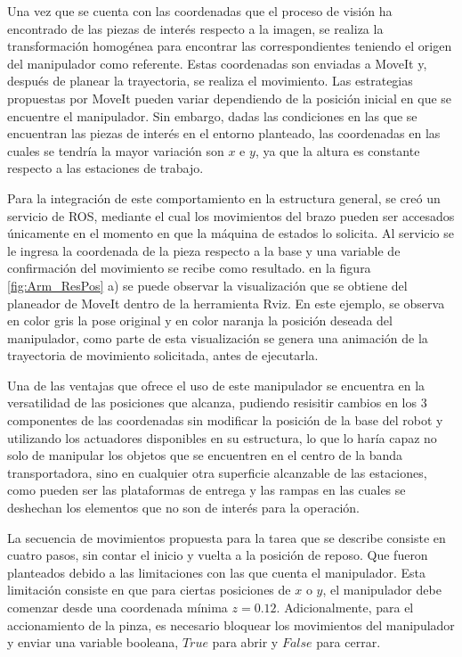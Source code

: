 Una vez que se cuenta con las coordenadas que el proceso de visión ha encontrado de las piezas de interés respecto a la imagen, se realiza la transformación homogénea para encontrar las correspondientes teniendo el origen del manipulador como referente. Estas coordenadas son enviadas a MoveIt y, después de planear la trayectoria, se realiza el movimiento. Las estrategias propuestas por MoveIt pueden variar dependiendo de la posición inicial en que se encuentre el manipulador. Sin embargo, dadas las condiciones en las que se encuentran las piezas de interés en el entorno planteado, las coordenadas en las cuales se tendría la mayor variación son $x$ e $y$, ya que la altura es constante respecto a las estaciones de trabajo. 

Para la integración de este comportamiento en la estructura general, se creó un servicio de ROS, mediante el cual los movimientos del brazo pueden ser accesados únicamente en el momento en que la máquina de estados lo solicita. Al servicio se le ingresa la coordenada de la pieza respecto a la base y una variable de confirmación del movimiento se recibe como resultado. en la figura \ref{fig:Arm_ResPos} a) se puede observar la visualización que se obtiene del planeador de MoveIt dentro de la herramienta Rviz. En este ejemplo, se observa en color gris la pose original y en color naranja la posición deseada del manipulador, como parte de esta visualización se genera una animación de la trayectoria de movimiento solicitada, antes de ejecutarla.

Una de las ventajas que ofrece el uso de este manipulador se encuentra en la versatilidad de las posiciones que alcanza, pudiendo resisitir cambios en los 3 componentes de las coordenadas sin modificar la posición de la base del robot y utilizando los actuadores disponibles en su estructura, lo que lo haría capaz no solo de manipular los objetos que se encuentren en el centro de la banda transportadora, sino en cualquier otra superficie alcanzable de las estaciones, como pueden ser las plataformas de entrega y las rampas en las cuales se deshechan los elementos que no son de interés para la operación. 

La secuencia de movimientos propuesta para la tarea que se describe consiste en cuatro pasos, sin contar el inicio y vuelta a la posición de reposo. Que fueron planteados debido a las limitaciones con las que cuenta el manipulador. Esta limitación consiste en que para ciertas posiciones de $x$ o $y$, el manipulador debe comenzar desde una coordenada mínima $z = 0.12$. Adicionalmente, para el accionamiento de la pinza, es necesario bloquear los movimientos del manipulador y enviar una variable booleana, $True$ para abrir y $False$ para cerrar.

